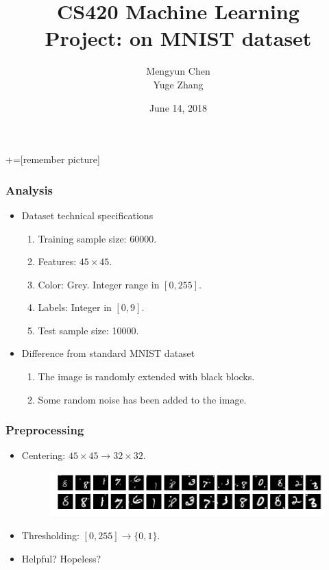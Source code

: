 \documentclass[11pt]{beamer} %
\author[Mengyun Chen, Yuge Zhang]{Mengyun Chen \quad 716030210013 \texorpdfstring{\\ Yuge Zhang \quad 716030210014}{}}
\date{June 14, 2018}
\begin{document}
\title[CS420 Project]{CS420 Machine Learning \\ Project: on MNIST dataset}

+=[remember picture]

\everymath{\displaystyle}

\begin{frame}
\titlepage %
\end{frame}

\begin{frame}
\frametitle{Analysis}
\begin{itemize}
    \item Dataset technical specifications
        \begin{enumerate}
        \item Training sample size: 60000.
        \item Features: $45 \times 45$.
        \item Color: Grey. Integer range in $[0, 255]$.
        \item Labels: Integer in $[0,9]$.
        \item Test sample size: 10000.
        \end{enumerate}
        
    \item Difference from standard MNIST dataset
        \begin{enumerate}
        \item The image is randomly extended with black blocks.
        \item Some random noise has been added to the image.
        \end{enumerate}
\end{itemize}

\end{frame}


\begin{frame}
\frametitle{Preprocessing}
\begin{itemize}
    \item Centering: $45 \times 45 \rightarrow 32 \times 32$.
    \begin{figure}[htbp]
    \centering
    \includegraphics[width=1.0\linewidth]{img/centralize.png}
    \end{figure}
    
    \item Thresholding: $[0, 255] \rightarrow \{0, 1\}$.
    
    \item Helpful? Hopeless?
\end{itemize}

\end{frame}
\end{document}
